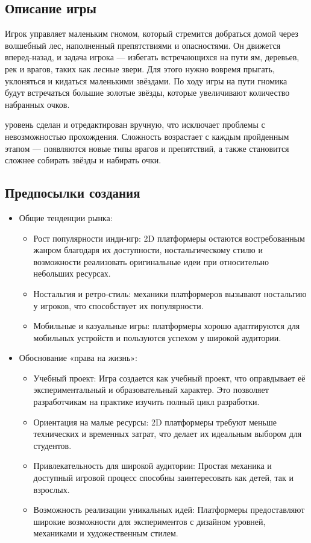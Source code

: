 \documentclass{article}
\begin{document}
\subsection{Описание игры}

Игрок управляет маленьким гномом, который стремится добраться домой через волшебный лес, наполненный препятствиями и опасностями. Он движется вперед-назад, и задача игрока — избегать встречающихся на пути ям, деревьев, рек и врагов, таких как лесные звери. Для этого нужно вовремя прыгать, уклоняться и кидаться маленькими звёздами. По ходу игры на пути гномика будут встречаться большие золотые звёзды, которые увеличивают количество набранных очков.

 уровень сделан и отредактирован вручную, что исключает проблемы с невозможностью прохождения. Сложность возрастает с каждым пройденным этапом — появляются новые типы врагов и препятствий, а также становится сложнее собирать звёзды и набирать очки.

\subsection{Предпосылки создания}

\begin{itemize}
\item Общие тенденции рынка:
	\begin{itemize}
            \item Рост популярности инди-игр: 2D платформеры остаются востребованным жанром благодаря их доступности, ностальгическому стилю и возможности реализовать оригинальные идеи при относительно небольших ресурсах.
            \item Ностальгия и ретро-стиль: механики платформеров вызывают ностальгию у игроков, что способствует их популярности.
            \item Мобильные и казуальные игры: платформеры хорошо адаптируются для мобильных устройств и пользуются успехом у широкой аудитории.
	\end{itemize}

\item Обоснование «права на жизнь»:
	\begin{itemize}
            \item Учебный проект: Игра создается как учебный проект, что оправдывает её экспериментальный и образовательный характер. Это позволяет разработчикам на практике изучить полный цикл разработки.
            \item Ориентация на малые ресурсы: 2D платформеры требуют меньше технических и временных затрат, что делает их идеальным выбором для студентов.
            \item Привлекательность для широкой аудитории: Простая механика и доступный игровой процесс способны заинтересовать как детей, так и взрослых.
            \item Возможность реализации уникальных идей: Платформеры предоставляют широкие возможности для экспериментов с дизайном уровней, механиками и художественным стилем.
	\end{itemize}
\end{itemize}
\end{document}
